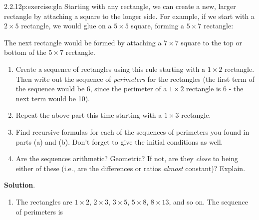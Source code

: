 \documentclass[twoside,11pt,]{book}
\newcommand{\blocktitlefont}{\relax}
\numberwithin{equation}{chapter}
\begin{document}
\begin{divisionsolution}{2.2.12}{}{p:exercise:gla}%
Starting with any rectangle, we can create a new, larger rectangle by attaching a square to the longer side. For example, if we start with a \(2\times 5\) rectangle, we would glue on a \(5\times 5\) square, forming a \(5 \times 7\) rectangle:%
\begin{sidebyside}{1}{0.2}{0.2}{0}%
\begin{sbspanel}{0.6}%
%
\end{sbspanel}%
\end{sidebyside}%
\par
The next rectangle would be formed by attaching a \(7 \times 7\) square to the top or bottom of the \(5\times 7\) rectangle. %
\begin{enumerate}[label=(\alph*)]
\item{}Create a sequence of rectangles using this rule starting with a \(1\times 2\) rectangle. Then write out the sequence of \emph{perimeters} for the rectangles (the first term of the sequence would be 6, since the perimeter of a \(1\times 2\) rectangle is 6 - the next term would be 10).%
\item{}Repeat the above part this time starting with a \(1 \times 3\) rectangle.%
\item{}Find recursive formulas for each of the sequences of perimeters you found in parts (a) and (b). Don't forget to give the initial conditions as well.%
\item{}Are the sequences arithmetic? Geometric? If not, are they \emph{close} to being either of these (i.e., are the differences or ratios \emph{almost} constant)? Explain.%
\end{enumerate}
%
\par\smallskip%
\noindent\textbf{\blocktitlefont Solution}.\quad{}%
\begin{enumerate}[label=(\alph*)]
\item{}The rectangles are \(1 \times 2\), \(2 \times 3\), \(3 \times 5\), \(5 \times 8\), \(8 \times 13\), and so on. The sequence of perimeters is%

\end{enumerate}
\end{divisionsolution}
\end{document}
